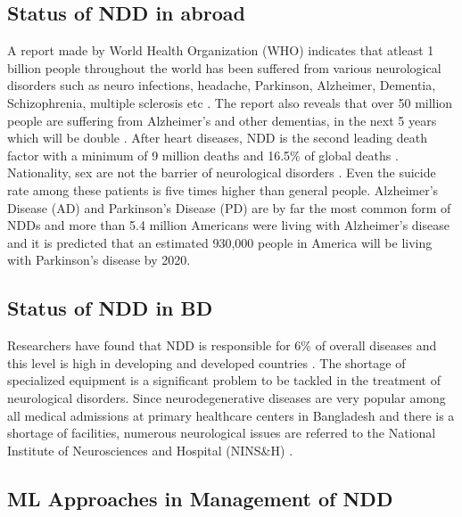 \subsection{Status of NDD in abroad}
A report made by World Health Organization (WHO) indicates that atleast 1 billion people throughout the world has been suffered from various neurological disorders such as neuro infections, headache, Parkinson, Alzheimer, Dementia, Schizophrenia, multiple sclerosis etc \cite{siuly_medical_2016}. The report also reveals that over 50 million people are suffering from Alzheimer's and other dementias, in the next 5 years which will be double \cite{noauthor_dementia_nodate}. After heart diseases, NDD is the second leading death factor with a minimum of 9 million deaths and 16.5\% of global deaths \cite{carroll_global_2019}. Nationality, sex are not the barrier of neurological disorders \cite{noauthor_who_nodate}. Even the suicide rate among these patients is five times higher than general people. Alzheimer’s Disease (AD) and Parkinson’s Disease (PD) are by far the most common form of NDDs and more than 5.4 million Americans were living with Alzheimer’s disease and it is predicted that an estimated 930,000 people in America will be living with Parkinson’s disease by 2020.

\subsection{Status of NDD in BD}
Researchers have found that NDD is responsible for 6\% of overall diseases and this level is high in developing and developed countries \cite{noauthor_journal_nodate}. The shortage of specialized equipment is a significant problem to be tackled in the treatment of neurological disorders. Since neurodegenerative diseases are very popular among all medical admissions at primary healthcare centers in Bangladesh and there is a shortage of facilities, numerous neurological issues are referred to the National Institute of Neurosciences and Hospital (NINS\&H) \cite{alam_neurological_2015}.




\subsection{ML Approaches in Management of NDD}

